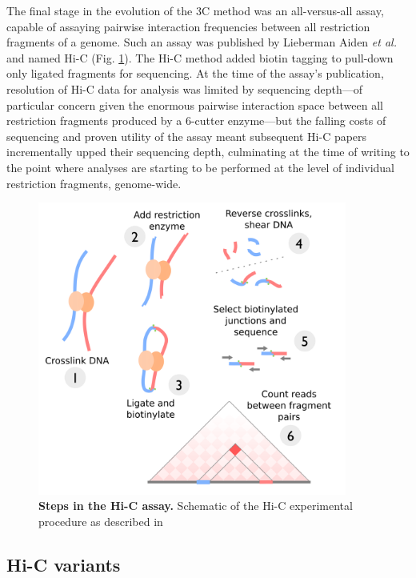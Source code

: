 \documentclass[a4paper,11pt,oneside]{book}
\begin{document}
The final stage in the evolution of the 3C method was an all-versus-all assay, capable of assaying pairwise interaction frequencies between all restriction fragments of a genome. Such an assay was published by Lieberman Aiden \emph{et al.}\cite{Lieberman2009} and named Hi-C (Fig. \ref{fig:hicmethod}). The Hi-C method added biotin tagging to pull-down only ligated fragments for sequencing. At the time of the assay's publication, resolution of Hi-C data for analysis was limited by sequencing depth---of particular concern given the enormous pairwise interaction space between all restriction fragments produced by a 6-cutter enzyme---but the falling costs of sequencing and proven utility of the assay meant subsequent Hi-C papers incrementally upped their sequencing depth, culminating at the time of writing to the point where analyses are starting to be performed at the level of individual restriction fragments, genome-wide.\cite{Dixon2012,  Selvaraj2013a, Jin2013, Rao2014}

\begin{figure}
\begin{center}
\includegraphics[width=4in]{hic.png}
\captionsetup{width=\textwidth}
\caption[Steps in the Hi-C assay.]{ {\bf Steps in the Hi-C assay. } 
  Schematic of the Hi-C experimental procedure as described in \citet{Lieberman2009}
}\label{fig:hicmethod}
\end{center}
\end{figure} 

\subsection{Hi-C variants}\label{sec:hicvar}
\end{document}
